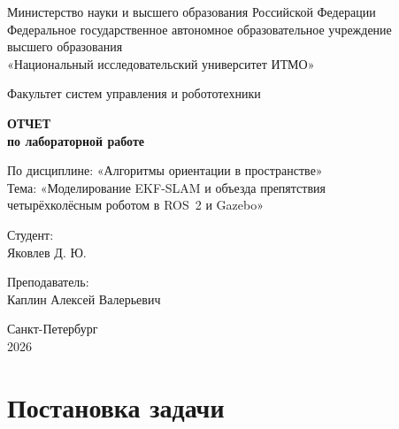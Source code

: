 \documentclass[a4paper,12pt]{article}
\begin{document}
\begin{titlepage}
    \centering

    {\small
        Министерство науки и высшего образования Российской Федерации\\
        Федеральное государственное автономное образовательное учреждение\\
        высшего образования\\
        «Национальный исследовательский университет ИТМО»
    }

    \vspace{1.8cm}

    {\large
        Факультет систем управления и робототехники
    }

    \vspace{2.8cm}

    {\Huge\bfseries ОТЧЕТ\\}
    \vspace{0.4cm}
    {\LARGE\bfseries по лабораторной работе\\}

    \vspace{1.0cm}

    {\Large
        По дисциплине: «Алгоритмы ориентации в пространстве»\\
        \vspace{0.4cm}
        Тема: «Моделирование EKF-SLAM и объезда препятствия\\
        четырёхколёсным роботом в ROS~2 и Gazebo»
    }

    \vspace{2.5cm}

    \begin{minipage}{0.45\textwidth}
        \raggedright
        {\large Студент:}\\
        Яковлев Д. Ю.
    \end{minipage}
    \hfill
    \begin{minipage}{0.45\textwidth}
        \raggedleft
        {\large Преподаватель:}\\
        Каплин Алексей Валерьевич
    \end{minipage}

    \vfill

    {\large
        Санкт-Петербург\\
        2026
    }
\end{titlepage}

\tableofcontents
\clearpage

\section{Постановка задачи}
\end{document}

